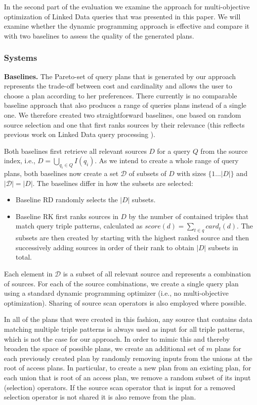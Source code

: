 In the second part of the evaluation we examine the approach for
multi-objective optimization of Linked Data queries that was presented
in this paper. We will examine whether the dynamic programming
approach is effective and compare it with two baselines to assess the
quality of the generated plans.

\subsubsection{Systems}

\textbf{Baselines.} The Pareto-set of query plans that is generated by
our approach represents the trade-off between cost and cardinality and
allows the user to choose a plan according to her preferences. There
currently is no comparable baseline approach that also produces a
range of queries plans instead of a single one. We therefore created
two straightforward baselines, one based on random source selection
and one that first ranks sources by their relevance (this reflects
previous work on Linked Data query processing
\cite{harth_data_2010,ladwig_linked_2010}).

Both baselines first retrieve all relevant sources $D$ for a query $Q$
from the source index, i.e., $D = \bigcup_{q_i \in Q} I(q_i)$. As we
intend to create a whole range of query plans, both baselines now
create a set $\mathcal{D}$ of subsets of $D$ with sizes $\{1\ldots
|D|\}$ and $|\mathcal{D}| = |D|$. The baselines differ in how the
subsets are selected:
\begin{itemize}
\item Baseline RD randomly selects the $|D|$ subsets.
\item Baseline RK first ranks sources in $D$ by the number of
  contained triples that match query triple patterns, calculated as
  $score(d) = \sum_{t \in q} card_t(d)$. The subsets are then created
  by starting with the highest ranked source and then successively
  adding sources in order of their rank to obtain $|D|$ subsets in
  total.
\end{itemize}
Each element in $\mathcal{D}$ is a subset of all relevant source and
represents a combination of sources. For each of the source
combinations, we create a single query plan using a standard dynamic
programming optimizer (i.e., no multi-objective optimization). Sharing
of source scan operators is also employed where possible.

In all of the plans that were created in this fashion, any source that
contains data matching multiple triple patterns is always used as
input for all triple patterns, which is not the case for our
approach. In order to mimic this and thereby broaden the space of
possible plans, we create an additional set of $m$ plans for each
previously created plan by randomly removing inputs from the unions at
the root of access plans. In particular, to create a new plan from an
existing plan, for each union that is root of an access plan, we
remove a random subset of its input (selection) operators. If the
source scan operator that is input for a removed selection operator is
not shared it is also remove from the plan.

